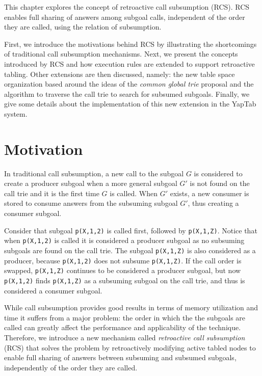 This chapter explores the concept of retroactive call subsumption (RCS). RCS
enables full sharing of answers among subgoal calls, independent of the order they are called,
using the relation of subsumption.

First, we introduce the motivations behind RCS by illustrating the shortcomings of traditional call
subsumption mechanisms. Next, we present the concepts introduced by RCS and how execution
rules are extended to support retroactive tabling. Other extensions are then discussed, namely:
the new table space organization based around the ideas of the \textit{common global trie} proposal
\cite{CostaJ-08} and the algorithm to traverse the call trie to search for subsumed subgoals. Finally, we
give some details about the implementation of this new extension in the YapTab system.

\section{Motivation}

In traditional call subsumption, a new call to the subgoal $G$ is considered to create a producer subgoal
when a more general subgoal $G'$ is not found on the call trie and it is the first time $G$ is called.
When $G'$ exists, a new consumer is stored to consume answers from the subsuming subgoal $G'$, thus creating
a consumer subgoal.

Consider that subgoal \texttt{p(X,1,2)} is called first, followed by \texttt{p(X,1,Z)}.
Notice that when \texttt{p(X,1,2)} is called it is considered a producer subgoal as no subsuming subgoals
are found on the call trie. The subgoal \texttt{p(X,1,Z)} is also considered as a producer, because
\texttt{p(X,1,2)} does not subsume \texttt{p(X,1,Z)}. If the call order is swapped, \texttt{p(X,1,Z)} continues
to be considered a producer subgoal, but now \texttt{p(X,1,2)} finds \texttt{p(X,1,Z)} as a subsuming subgoal
on the call trie, and thus is considered a consumer subgoal.

While call subsumption provides good results in terms of memory utilization and time it suffers from a
major problem: the order in which the the subgoals are called can greatly affect the performance
and applicability of the technique. Therefore, we introduce a new mechanism called \textit{retroactive call
subsumption} (RCS) that solves the problem by retroactively modifying active tabled nodes to enable full sharing
of answers between subsuming and subsumed subgoals, independently of the order they are called.

